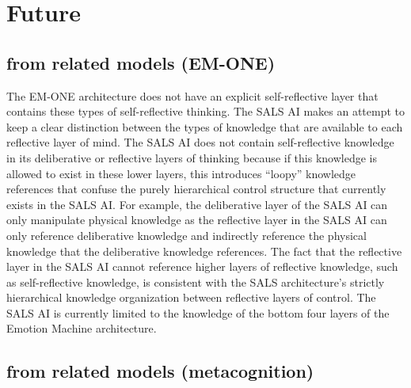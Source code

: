 \chapter{Future}\label{chapter:future}

\section{from related models (EM-ONE)}

The EM-ONE architecture does not have an explicit self-reflective
layer that contains these types of self-reflective thinking.  The SALS
AI makes an attempt to keep a clear distinction between the types of
knowledge that are available to each reflective layer of mind.  The
SALS AI does not contain self-reflective knowledge in its deliberative
or reflective layers of thinking because if this knowledge is allowed
to exist in these lower layers, this introduces ``loopy'' knowledge
references that confuse the purely hierarchical control structure that
currently exists in the SALS AI.  For example, the deliberative layer
of the SALS AI can only manipulate physical knowledge as the
reflective layer in the SALS AI can only reference deliberative
knowledge and indirectly reference the physical knowledge that the
deliberative knowledge references.  The fact that the reflective layer
in the SALS AI cannot reference higher layers of reflective knowledge,
such as self-reflective knowledge, is consistent with the SALS
architecture's strictly hierarchical knowledge organization between
reflective layers of control.  The SALS AI is currently limited to the
knowledge of the bottom four layers of the Emotion Machine
architecture.

\section{from related models (metacognition)}

